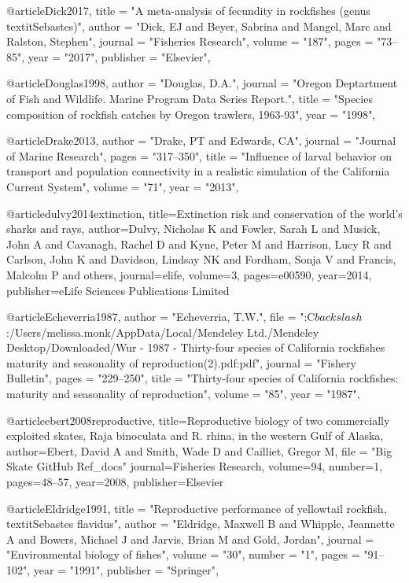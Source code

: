 @article{Dick2017,
    title = "{A meta-analysis of fecundity in rockfishes (genus \\textit{{{Sebastes}}})}",
    author = "{Dick, EJ and Beyer, Sabrina and Mangel, Marc and Ralston, Stephen}",
    journal = "{Fisheries Research}",
    volume = "{187}",
    pages = "{73--85}",
    year = "{2017}",
    publisher = "{Elsevier}",
}

@article{Douglas1998,
    author = "{Douglas, D.A.}",
    journal = "{Oregon Deptartment of Fish and Wildlife. Marine Program Data Series Report.}",
    title = "{{Species composition of rockfish catches by Oregon trawlers, 1963-93}}",
    year = "{1998}",
}

@article{Drake2013,
    author = "{Drake, PT and Edwards, CA}",
    journal = "{Journal of Marine Research}",
    pages = "{317--350}",
    title = "{{Influence of larval behavior on transport and population connectivity in a realistic simulation of the California Current System}}",
    volume = "{71}",
    year = "{2013}",
}

@article{dulvy2014extinction,
  title={Extinction risk and conservation of the world’s sharks and rays},
  author={Dulvy, Nicholas K and Fowler, Sarah L and Musick, John A and Cavanagh, Rachel D and Kyne, Peter M and Harrison, Lucy R and Carlson, John K and Davidson, Lindsay NK and Fordham, Sonja V and Francis, Malcolm P and others},
  journal={elife},
  volume={3},
  pages={e00590},
  year={2014},
  publisher={eLife Sciences Publications Limited}
}

@article{Echeverria1987,
    author = "{Echeverria, T.W.}",
    file = "{:C$\\backslash$:/Users/melissa.monk/AppData/Local/Mendeley Ltd./Mendeley Desktop/Downloaded/Wur - 1987 - Thirty-four species of California rockfishes maturity and seasonality of reproduction(2).pdf:pdf}",
    journal = "{Fishery Bulletin}",
    pages = "{229--250}",
    title = "{{Thirty-four species of California rockfishes: maturity and seasonality of reproduction}}",
    volume = "{85}",
    year = "{1987}",
}

@article{ebert2008reproductive,
  title={Reproductive biology of two commercially exploited skates, Raja binoculata and R. rhina, in the western Gulf of Alaska},
  author={Ebert, David A and Smith, Wade D and Cailliet, Gregor M},
  file = "{Big Skate GitHub Ref_docs}"
  journal={Fisheries Research},
  volume={94},
  number={1},
  pages={48--57},
  year={2008},
  publisher={Elsevier}
}

@article{Eldridge1991,
    title = "{Reproductive performance of yellowtail rockfish, \\textit{{{Sebastes}} flavidus}}",
    author = "{Eldridge, Maxwell B and Whipple, Jeannette A and Bowers, Michael J and Jarvis, Brian M and Gold, Jordan}",
    journal = "{Environmental biology of fishes}",
    volume = "{30}",
    number = "{1}",
    pages = "{91--102}",
    year = "{1991}",
    publisher = "{Springer}",
}

